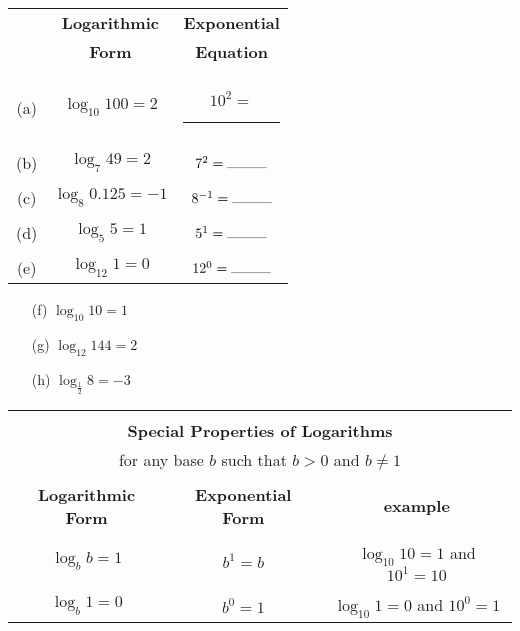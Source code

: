 \documentclass{report}
\theoremstyle{definition}
\begin{document}
\begin{minipage}[t]{0.45\linewidth}
 	\begin{tabular}[t]{c|c|c|}
 	\cline{2-3}
 	& \textbf{Logarithmic } & \textbf{Exponential}\\
 	& \textbf{Form} & \textbf{Equation}\\
 	\cline{2-3}
 	&&\\
 	(a) &$\log_10 100 = 2$ &  $10^2=$ \rule{1cm}{0.01cm}\\
 	\cline{2-3}
 	&&\\
 	(b) &$\log_7 49 = 2  $ & $7^2=\rule{1cm}{0.01cm}$ \\
 	\cline{2-3}	 
 	&&\\
 	(c) & $\log_8 0.125= -1 $ & $8^{-1}=\rule{1cm}{0.01cm}$ \\
 	\cline{2-3}
 	&&\\
 	(d) & $\log_5 5 = 1$ & $5^{1}=\rule{1cm}{0.01cm}$ \\
 	\cline{2-3}
 	&&\\
 	(e) & $\log_12  1 = 0 $ & $12^0=\rule{1cm}{0.01cm}$ \\	
 	\cline{2-3}
 	\end{tabular}
\end{minipage}
\hspace{1.25cm}
 \begin{minipage}[t]{0.45\linewidth}
 	\vspace{0.5cm}
	 \begin{itemize}
	 	\item[(f)] $\log_{10} 10=1$\\
	 	\vspace{0.5cm}
	 	\item[(g)] $\log_{12} 144=2$ \\
		\vspace{0.5cm}
	 	\item[(h)] $\log_{\frac{1}{2}}8 = -3$ \\
	 	\vspace{0.5cm}
	 \end{itemize}
\end{minipage}

\vfill

\begin{center}
	\begin{tabular}[t]{|c|c|c|}
		\hline
		\multicolumn{3}{|c|}{}\\
		\multicolumn{3}{|c|}{\large\textbf{Special Properties of Logarithms}}\\
		\multicolumn{3}{|c|}{\small for any base $b$ such that $b>0$ and $b\neq 1$\normalsize}\\
		\hline
		&&\\
		\textbf{Logarithmic Form} & \textbf{Exponential Form} & \textbf{example}\\
		\hline
		&&\\
		$\log_bb=1$ & $b^1=b$ & $\log_{10}10=1$ and $10^1=10$\\
		\hline
		&&\\
		$\log_b1=0$ & $b^0=1$ & $\log_{10}{1}=0$ and $10^0=1$\\
		\hline 
	 \end{tabular}
\end{center}
\end{document}
